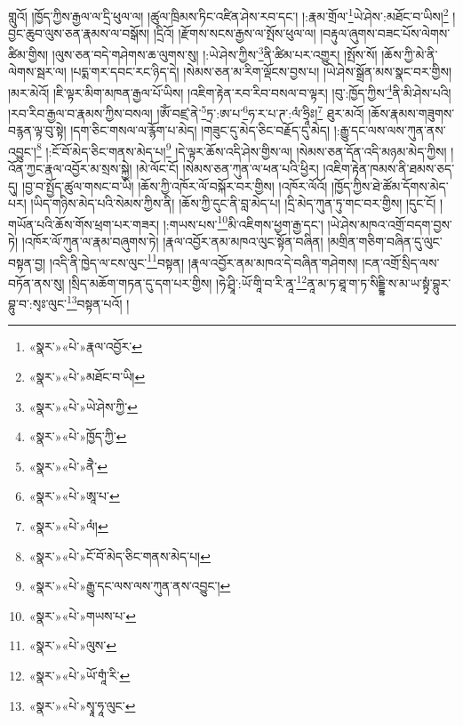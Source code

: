 གླུའོ། །ཁྱོད་ཀྱིས་རྒྱལ་ལ་དྲི་ཕུལ་ལ། །ཚུལ་ཁྲིམས་ཏིང་འཛིན་ཤེས་རབ་དང་། །:རྣམ་གྲོལ་\footnote{«སྣར་»«པེ་»རྣལ་འབྱོར་}ཡེ་ཤེས་:མཐོང་བ་ཡིས།\footnote{«སྣར་»«པེ་»མཐོང་བ་ཡི།} །བྱང་ཆུབ་ལུས་ཅན་རྣམས་ལ་བསྒོས། །དྲིའོ། །རྫོགས་སངས་རྒྱས་ལ་སྤོས་ཕུལ་ལ། །བརྟུལ་ཞུགས་བཟང་པོས་ལེགས་ཚིམ་གྱིས། །ལུས་ཅན་བདེ་གཤེགས་ཆ་ལུགས་སུ། །:ཡེ་ཤེས་ཀྱིས་\footnote{«སྣར་»«པེ་»ཡེ་ཤེས་ཀྱི་}ནི་ཚིམ་པར་འགྱུར། །སྤོས་སོ། །ཆོས་ཀྱི་མེ་ནི་ལེགས་སྦར་ལ། །པདྨ་གར་དབང་རང་ཉིད་དེ། །སེམས་ཅན་མ་རིག་ལྡོངས་བྱས་པ། །ཡེ་ཤེས་སྒྲོན་མས་སྣང་བར་གྱིས། །མར་མེའོ། །ཇི་ལྟར་མིག་མཁན་རྒྱལ་པོ་ཡིས། །འཇིག་རྟེན་རབ་རིབ་བསལ་བ་ལྟར། །བུ་:ཁྱོད་ཀྱིས་\footnote{«སྣར་»«པེ་»ཁྱོད་ཀྱི་}ནི་མི་ཤེས་པའི། །རབ་རིབ་རྒྱལ་བ་རྣམས་ཀྱིས་བསལ། །ཨོཾ་བཛྲ་ནེ་\footnote{«སྣར་»«པེ་»ནཻ་}ཏྲ་:ཨ་པ་\footnote{«སྣར་»«པེ་»ཨཱ་པ་}ཧ་ར་པ་ཊ་:ལཾ་ཧྲཱིཿ།\footnote{«སྣར་»«པེ་»ལཾ།} ཐུར་མའོ། །ཆོས་རྣམས་གཟུགས་བརྙན་ལྟ་བུ་སྟེ། །དག་ཅིང་གསལ་ལ་རྙོག་པ་མེད། །གཟུང་དུ་མེད་ཅིང་བརྗོད་དུ་མེད། །:རྒྱུ་དང་ལས་ལས་ཀུན་ནས་འབྱུང་།\footnote{«སྣར་»«པེ་»ངོ་བོ་མེད་ཅིང་གནས་མེད་པ།} །:ངོ་བོ་མེད་ཅིང་གནས་མེད་པ།\footnote{«སྣར་»«པེ་»རྒྱུ་དང་ལས་ལས་ཀུན་ནས་འབྱུང་།} །དེ་ལྟར་ཆོས་འདི་ཤེས་གྱིས་ལ། །སེམས་ཅན་དོན་འདི་མཉམ་མེད་ཀྱིས། །འོན་ཀྱང་རྣལ་འབྱོར་མ་སྲས་སྐྱེ། །མེ་ལོང་ངོ། །སེམས་ཅན་ཀུན་ལ་ཕན་པའི་ཕྱིར། །འཇིག་རྟེན་ཁམས་ནི་ཐམས་ཅད་དུ། །བྱ་བ་སྤྱོད་ཚུལ་གསང་བ་ཡི། །ཆོས་ཀྱི་འཁོར་ལོ་བསྐོར་བར་གྱིས། །འཁོར་ལོའོ། །ཁྱོད་ཀྱིས་ཐེ་ཚོམ་དོགས་མེད་པར། །ཡིད་གཉིས་མེད་པའི་སེམས་ཀྱིས་ནི། །ཆོས་ཀྱི་དུང་ནི་བླ་མེད་པ། །དྲི་མེད་ཀུན་ཏུ་གང་བར་གྱིས། །དུང་ངོ། །གཡོན་པའི་ཆོས་གོས་ཕྲག་པར་གཟར། །:གཡས་པས་\footnote{«སྣར་»«པེ་»གཡས་པ་}མི་འཇིགས་ཕྱག་རྒྱ་དང་། །ཡེ་ཤེས་མཁའ་འགྲོ་བདག་བྱས་ཏེ། །འཁོར་ལོ་ཀུན་ལ་རྣམ་བཞུགས་ཏེ། །རྣལ་འབྱོར་ནམ་མཁའ་ལུང་སྟོན་བཞིན། །མགྲིན་གཅིག་བཞིན་དུ་ལུང་བསྟན་བྱ། །འདི་ནི་ཁྱེད་ལ་ངས་ལུང་\footnote{«སྣར་»«པེ་»ལུས་}བསྟན། །རྣལ་འབྱོར་ནམ་མཁའ་དེ་བཞིན་གཤེགས། །ངན་འགྲོ་སྲིད་ལས་བཏོན་ནས་སུ། །སྲིད་མཆོག་གཏན་དུ་དག་པར་གྱིས། །ཧེ་ཤྲཱི་:ཡོ་གཱི་བ་རི་ནཱ་\footnote{«སྣར་»«པེ་»ཡོ་གཱཾ་རི་}ནཱ་མ་ཏ་ཐཱ་ག་ཏ་སིདྡྷི་ས་མ་ཡ་སྟྭཾ་བྷུར་བྷུ་བ་:སྭཿ་ལུང་\footnote{«སྣར་»«པེ་»སྭཱ་ཧཱ་ལུང་}བསྟན་པའོ། །
